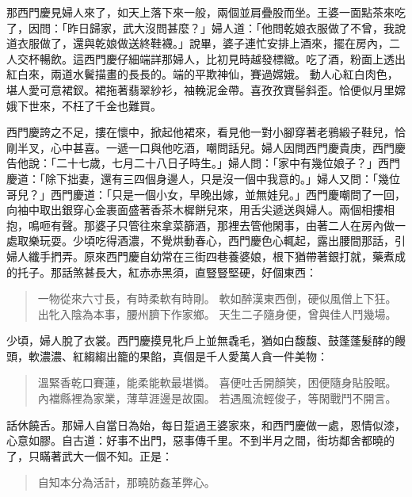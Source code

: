 那西門慶見婦人來了，如天上落下來一般，兩個並肩疊股而坐。王婆一面點茶來吃了，因問：「昨日歸家，武大沒問甚麼？」婦人道：「他問乾娘衣服做了不曾，我說道衣服做了，還與乾娘做送終鞋襪。」說畢，婆子連忙安排上酒來，擺在房內，二人交杯暢飲。這西門慶仔細端詳那婦人，比初見時越發標緻。吃了酒，粉面上透出紅白來，兩道水鬢描畫的長長的。端的平欺神仙，賽過嫦娥。
動人心紅白肉色，堪人愛可意裙釵。裙拖著翡翠紗衫，袖輓泥金帶。喜孜孜寶髻斜歪。恰便似月里嫦娥下世來，不枉了千金也難買。

西門慶誇之不足，摟在懷中，掀起他裙來，看見他一對小腳穿著老鴉緞子鞋兒，恰剛半叉，心中甚喜。一遞一口與他吃酒，嘲問話兒。婦人因問西門慶貴庚，西門慶告他說：「二十七歲，七月二十八日子時生。」婦人問：「家中有幾位娘子？」西門慶道：「除下拙妻，還有三四個身邊人，只是沒一個中我意的。」婦人又問：「幾位哥兒？」西門慶道：「只是一個小女，早晚出嫁，並無娃兒。」西門慶嘲問了一回，向袖中取出銀穿心金裹面盛著香茶木樨餅兒來，用舌尖遞送與婦人。兩個相摟相抱，鳴咂有聲。那婆子只管往來拿菜篩酒，那裡去管他閑事，由著二人在房內做一處取樂玩耍。少頃吃得酒濃，不覺烘動春心，西門慶色心輒起，露出腰間那話，引婦人纖手捫弄。原來西門慶自幼常在三街四巷養婆娘，根下猶帶著銀打就，藥煮成的托子。那話煞甚長大，紅赤赤黑須，直豎豎堅硬，好個東西：
\begin{quote}
一物從來六寸長，有時柔軟有時剛。
軟如醉漢東西倒，硬似風僧上下狂。
出牝入陰為本事，腰州臍下作家鄉。
天生二子隨身便，曾與佳人鬥幾場。
\end{quote}

少頃，婦人脫了衣裳。西門慶摸見牝戶上並無毳毛，猶如白馥馥、鼓蓬蓬髮酵的饅頭，軟濃濃、紅縐縐出籠的果餡，真個是千人愛萬人貪一件美物：
\begin{quote}
溫緊香乾口賽蓮，能柔能軟最堪憐。
喜便吐舌開顏笑，困便隨身貼股眠。
內襠縣裡為家業，薄草涯邊是故園。
若遇風流輕俊子，等閑戰鬥不開言。
\end{quote}

話休饒舌。那婦人自當日為始，每日踅過王婆家來，和西門慶做一處，恩情似漆，心意如膠。自古道：好事不出門，惡事傳千里。不到半月之間，街坊鄰舍都曉的了，只瞞著武大一個不知。正是：
\begin{quote}
自知本分為活計，那曉防姦革弊心。
\end{quote}

